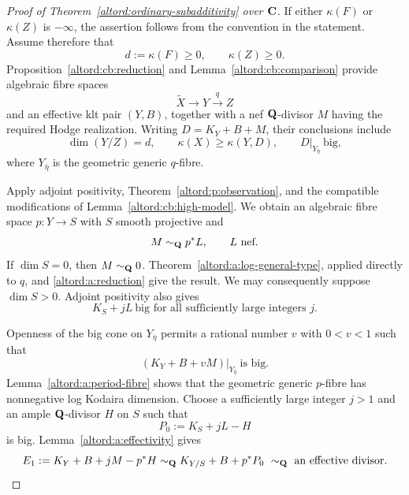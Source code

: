 \begin{proof}[Proof of Theorem~\ref{altord:ordinary-subadditivity} over \(\mathbf C\)]
If either \(\kappa(F)\) or \(\kappa(Z)\) is \(-\infty\), the
assertion follows from the convention in the statement.
Assume therefore that
\[
 d:=\kappa(F)\geq0,\qquad \kappa(Z)\geq0.
\]
Proposition~\ref{altord:cb:reduction} and Lemma~\ref{altord:cb:comparison}
provide algebraic fibre spaces
\[
 \widetilde X\longrightarrow Y\xrightarrow{q}Z
\]
and an effective klt pair \((Y,B)\), together with a nef
\(\mathbf Q\)-divisor \(M\) having the required Hodge realization.
Writing \(D=K_Y+B+M\), their conclusions include
\begin{equation}\label{altord:a:reduction}
 \dim(Y/Z)=d,\qquad
 \kappa(X)\geq\kappa(Y,D),\qquad
 D|_{Y_{\bar\eta}}\ \text{big},
\end{equation}
where \(Y_{\bar\eta}\) is the geometric generic \(q\)-fibre.

Apply adjoint positivity, Theorem~\ref{altord:p:observation},
and the compatible modifications of Lemma~\ref{altord:cb:high-model}.
We obtain an algebraic fibre space \(p:Y\to S\) with \(S\) smooth
projective and
\[
 M\sim_{\mathbf Q}p^*L,\qquad L\ \text{nef}.
\]
If \(\dim S=0\), then \(M\sim_{\mathbf Q}0\).
Theorem~\ref{altord:a:log-general-type}, applied directly to \(q\), and
\eqref{altord:a:reduction} give the result.
We may consequently suppose \(\dim S>0\).  Adjoint positivity also gives
\[
 K_S+jL\ \text{big for all sufficiently large integers }j.
\]

Openness of the big cone on \(Y_{\bar\eta}\) permits a rational
number \(v\) with \(0<v<1\) such that
\begin{equation}\label{altord:a:reduced-moduli}
 (K_Y+B+vM)|_{Y_{\bar\eta}}\ \text{is big}.
\end{equation}
Lemma~\ref{altord:a:period-fibre} shows that the geometric generic
\(p\)-fibre has nonnegative log Kodaira dimension.
Choose a sufficiently large integer \(j>1\) and an ample
\(\mathbf Q\)-divisor \(H\) on \(S\) such that
\[
 P_0:=K_S+jL-H
\]
is big.  Lemma~\ref{altord:a:effectivity} gives
\begin{equation}\label{altord:a:effective-term}
 E_1:=K_Y+B+jM-p^*H
      \sim_{\mathbf Q}K_{Y/S}+B+p^*P_0
      \ \sim_{\mathbf Q}\ \text{an effective divisor}.
\end{equation}


\end{proof}
